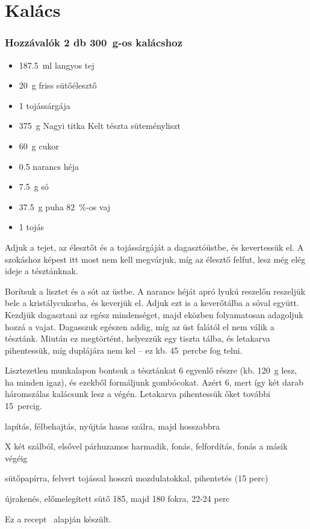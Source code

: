 \newpage
\section{Kalács} \label{sec:kalacs}

\subsubsection*{Hozzávalók 2 db \qty{300}{\g}-os kalácshoz}
\begin{itemize}
    \item \qty{187.5}{\ml} langyos tej
    \item \qty{20}{\g} friss sütőélesztő
    \item \num{1} tojássárgája
    \item \qty{375}{\g} Nagyi titka Kelt tészta süteményliszt
    \item \qty{60}{\g} cukor
    \item \num{0.5} narancs héja
    \item \qty{7.5}{\g} só
    \item \qty{37.5}{\g} puha \qty{82}{\percent}-os vaj
    \item \num{1} tojás
\end{itemize}

Adjuk a tejet, az élesztőt és a tojássárgáját a dagasztóüstbe, és kevertessük el. A szokáshoz képest itt most nem kell megvárjuk, míg az élesztő felfut, lesz még elég ideje a tésztánknak.

Borítsuk a lisztet és a sót az üstbe. A narancs héját apró lyukú reszelőn reszeljük bele a kristálycukorba, és keverjük el. Adjuk ezt is a keverőtálba a sóval együtt. Kezdjük dagasztani az egész mindenséget, majd eközben folyamatosan adagoljuk hozzá a vajat. Dagasszuk egészen addig, míg az üst falától el nem válik a tésztánk. Miután ez megtörtént, helyezzük egy tiszta tálba, és letakarva pihentessük, míg duplájára nem kel -- ez kb. \num{45}~percbe fog telni.

Lisztezetlen munkalapon bontsuk a tésztánkat 6 egyenlő részre (kb. \qty{120}{\g} lesz, ha minden igaz), és ezekből formáljunk gombócokat. Azért 6, mert így két darab háromszálas kalácsunk lesz a végén. Letakarva pihentessük őket további \num{15}~percig.

lapítás, félbehajtás, nyújtás hasas szálra, majd hosszabbra

X két szálból, elsővel párhuzamos harmadik, fonás, felfordítás, fonás a másik végéig

sütőpapírra, felvert tojással hosszú mozdulatokkal, pihentetés (15 perc)

újrakenés, előmelegített sütő 185, majd 180 fokra, 22-24 perc



Ez a recept~\cite{szabi_kalacs} alapján készült.
